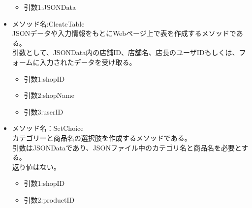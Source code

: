 \documentclass[a4j]{jarticle}
\begin{document}
\begin{itemize}
	\begin{itemize}
		\item 引数1:JSONData
	\end{itemize}
	\item メソッド名:CleateTable\\
JSONデータや入力情報をもとにWebページ上で表を作成するメソッドである。\\
引数として、JSONData内の店舗ID、店舗名、店長のユーザIDもしくは、フォームに入力されたデータを受け取る。
	\begin{itemize}	
		\item 引数1:shopID
		\item 引数2:shopName
		\item 引数3:userID
	\end{itemize}
\item メソッド名：SetChoice\\

カテゴリーと商品名の選択肢を作成するメソッドである。\\
引数はJSONDataであり、JSONファイル中のカテゴリ名と商品名を必要とする。\\
返り値はない。
	\begin{itemize}
		\item 引数1:shopID
		\item 引数2:productID
	\end{itemize}
			

\end{itemize}
\end{document}
